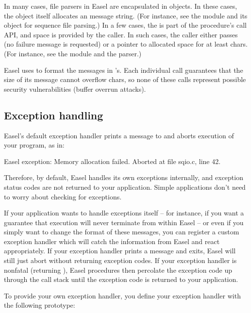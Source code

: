 In many cases, file parsers in Easel are encapsulated in objects. In
these cases, the object itself allocates an  message
string. (For instance, see the  module and its
 object for sequence file parsing.)  In a few
cases, the  is part of the procedure's call API, and
space is provided by the caller. In such cases, the caller either
passes  (no failure message is requested) or a pointer to
allocated space for at least  chars. (For
instance, see the  module and the
 parser.)

Easel uses  to format the messages in
's. Each individual call guarantees that the size of
its message cannot overflow  chars, so none of
these  calls represent possible security
vulnerabilities (buffer overrun attacks).


\subsection{Exception handling}

Easel's default exception handler prints a message to 
and aborts execution of your program, as in:

\begin{cchunk}
   Easel exception: Memory allocation failed.
   Aborted at file sqio.c, line 42. 
\end{cchunk}

Therefore, by default, Easel handles its own exceptions internally,
and exception status codes are not returned to your
application. Simple applications don't need to worry about checking
for exceptions.

If your application wants to handle exceptions itself -- for instance,
if you want a guarantee that execution will never terminate from
within Easel -- or even if you simply want to change the format of
these messages, you can register a custom exception handler which will
catch the information from Easel and react appropriately. If your
exception handler prints a message and exits, Easel will still just
abort without returning exception codes. If your exception handler is
nonfatal (returning ), Easel procedures then percolate the
exception code up through the call stack until the exception code is
returned to your application.

To provide your own exception handler, you define your exception
handler with the following prototype:

